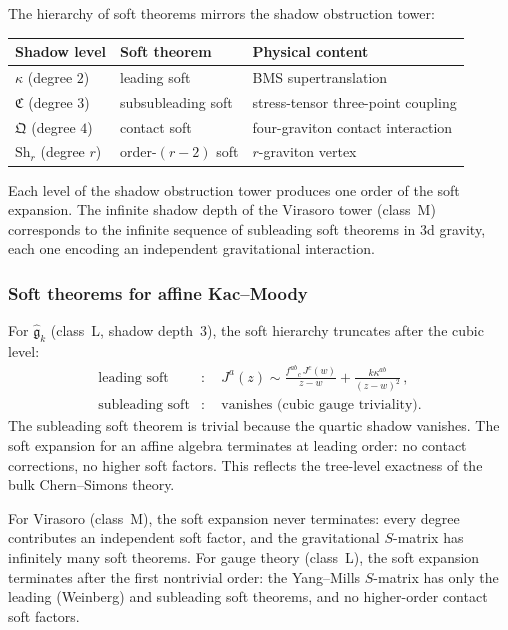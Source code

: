 The hierarchy of soft theorems mirrors the shadow obstruction
tower:
\begin{center}
\renewcommand{\arraystretch}{1.15}
\begin{tabular}{lll}
\textbf{Shadow level} & \textbf{Soft theorem}
 & \textbf{Physical content} \\
\hline
$\kappa$ (degree $2$) & leading soft
 & BMS supertranslation \\[2pt]
$\mathfrak C$ (degree $3$) & subsubleading soft
 & stress-tensor three-point coupling \\[2pt]
$\mathfrak Q$ (degree $4$) & contact soft
 & four-graviton contact interaction \\[2pt]
$\mathrm{Sh}_r$ (degree $r$) & order-$(r-2)$ soft
 & $r$-graviton vertex
\end{tabular}
\end{center}
Each level of the shadow obstruction tower produces one order of the
soft expansion. The infinite shadow depth of the Virasoro tower
(class~M) corresponds to the infinite sequence of subleading
soft theorems in 3d gravity, each one encoding an independent
gravitational interaction.

\subsubsection*{Soft theorems for affine Kac--Moody}

For $\widehat{\mathfrak g}_k$ (class~L, shadow depth~$3$), the
soft hierarchy truncates after the cubic level:
\begin{align*}
\text{leading soft}&:\quad
J^a(z)\sim\frac{f^{ab}{}_c\,J^c(w)}{z-w}
+\frac{k\kappa^{ab}}{(z-w)^2}\,,\\[4pt]
\text{subleading soft}&:\quad
\text{vanishes (cubic gauge triviality)}.
\end{align*}
The subleading soft theorem is trivial because the quartic shadow
vanishes. The soft expansion for an affine algebra terminates at
leading order: no contact corrections, no higher soft factors.
This reflects the tree-level exactness of the bulk Chern--Simons
theory.

For Virasoro (class~M), the
soft expansion never terminates: every degree contributes an
independent soft factor, and the gravitational $S$-matrix has
infinitely many soft theorems. For gauge theory (class~L), the
soft expansion terminates after the first nontrivial order: the
Yang--Mills $S$-matrix has only the leading (Weinberg) and
subleading soft theorems, and no higher-order contact soft
factors.


